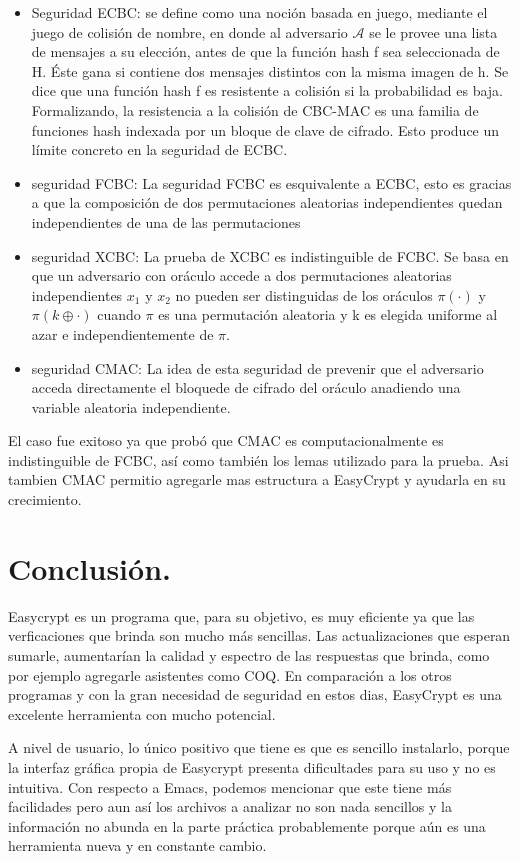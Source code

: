 \documentclass[runningheads,a4paper]{llncs}
\begin{document}
\begin{itemize}
	\item Seguridad ECBC: se define como una noción basada en juego, mediante el juego de colisión de nombre, en donde al adversario $\mathcal{A}$ se le provee una lista de mensajes a su elección, antes de que la función hash f sea seleccionada de H. Éste gana si contiene dos mensajes distintos con la misma imagen de h. Se dice que una función hash f es resistente a colisión si la probabilidad es baja. Formalizando, la resistencia a la colisión de CBC-MAC es una familia de funciones hash indexada por un bloque de clave de cifrado. Esto produce un límite concreto en la seguridad de ECBC.
	\item seguridad FCBC: La seguridad FCBC es esquivalente a ECBC, esto es gracias a que la composición de dos permutaciones aleatorias independientes quedan independientes de una de las permutaciones 
	\item seguridad XCBC: La prueba de XCBC es indistinguible de FCBC. Se basa en que un adversario con oráculo accede a dos permutaciones aleatorias independientes $x_1$ y $x_2$ no pueden ser distinguidas de los oráculos $\pi (\cdot)$ y $\pi (k \oplus \cdot)$ cuando $\pi$ es una permutación aleatoria y k es elegida uniforme al azar e independientemente de $\pi$.
	\item seguridad CMAC: La idea de esta seguridad de prevenir que el adversario acceda directamente el bloquede de cifrado del oráculo anadiendo una variable aleatoria independiente.
\end{itemize}
El caso fue exitoso ya que probó que CMAC es computacionalmente es indistinguible de FCBC, así como también los lemas utilizado para la prueba. Asi tambien CMAC permitio agregarle mas estructura a EasyCrypt y ayudarla en su crecimiento.\cite{article5}

\section{Conclusión.}


Easycrypt es un programa que, para su objetivo, es muy eficiente ya que las verficaciones que brinda son mucho más sencillas. Las actualizaciones que esperan sumarle, aumentarían la calidad y espectro de las respuestas que brinda, como por ejemplo agregarle asistentes como COQ. En comparación a los otros programas y con la gran necesidad de seguridad en estos dias, EasyCrypt es una excelente herramienta con mucho potencial.

A nivel de usuario, lo único positivo que tiene es que es sencillo instalarlo, porque la interfaz gráfica propia de Easycrypt presenta dificultades para su uso y no es intuitiva. Con respecto a Emacs, podemos mencionar que este tiene más facilidades pero aun así los archivos a analizar no son nada sencillos y la información no abunda en la parte práctica probablemente porque aún es una herramienta nueva y en constante cambio.
\end{document}
